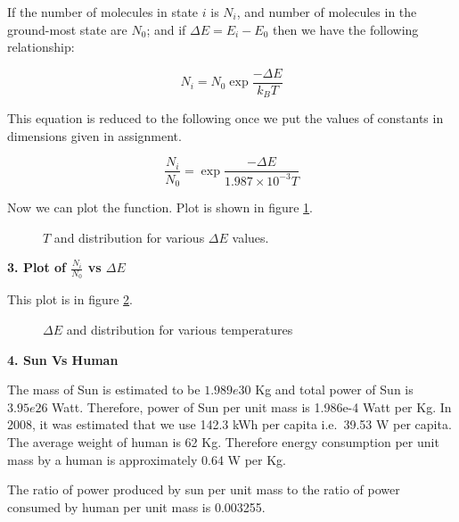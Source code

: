 \documentclass[]{article}
\begin{document}
If the number of molecules in state $i$ is $N_i$, and number of
molecules in the ground-most state are $N_0$; and if
$\Delta E = E_i - E_0$ then we have the following relationship:

\[ N_i = N_0 \exp{ \frac{-\Delta E}{k_B T}} \]

This equation is reduced to the following once we put the values of
constants in dimensions given in assignment.

\[ \frac{N_i}{N_0} = \exp{\frac{- \Delta E}{1.987\times 10^{-3}T}} \]

Now we can plot the function. Plot is shown in figure \ref{fig:1}.

\begin{figure}[h!]
\label{fig:1}
\caption{$T$ and distribution for various $\Delta E$ values.}
\end{figure}

\textbf{3. Plot of $\frac{N_i}{N_0}$ vs $\Delta E$}

This plot is in figure \ref{fig:2}.

\begin{figure}[h!]
\label{fig:2}
\caption{$\Delta E$ and distribution for various temperatures}
\end{figure}

\textbf{4. Sun Vs Human}

The mass of Sun is estimated to be $1.989e30$ Kg and total power of Sun
is $3.95e26$ Watt. Therefore, power of Sun per unit mass is 1.986e-4
Watt per Kg. In 2008, it was estimated that we use 142.3 kWh per capita
i.e.~39.53 W per capita. The average weight of human is 62 Kg. Therefore
energy consumption per unit mass by a human is approximately 0.64 W per
Kg.

The ratio of power produced by sun per unit mass to the ratio of power
consumed by human per unit mass is 0.003255.
\end{document}

